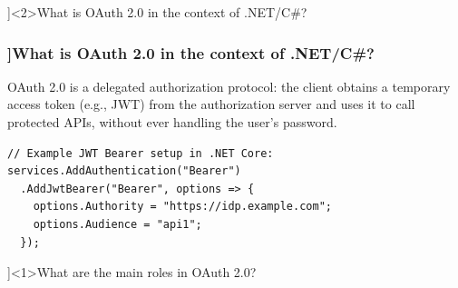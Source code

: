 \QuestionSlide[\CategoryBadge[AuthColor!20]{Security}]<2>{What is OAuth 2.0 in the context of .NET/C\#?}

\begin{frame}[fragile]
  \frametitle{\AnswerTitle[\CategoryBadge[OOPColor!20]{C\#} ]{What is OAuth 2.0 in the context of .NET/C\#?}}

  {\footnotesize
  OAuth 2.0 is a delegated authorization protocol: the client obtains a temporary access token (e.g., JWT) from the authorization server and uses it to call protected APIs, without ever handling the user’s password.
  }

  \begin{verbatim}
// Example JWT Bearer setup in .NET Core:
services.AddAuthentication("Bearer")
  .AddJwtBearer("Bearer", options => {
    options.Authority = "https://idp.example.com";
    options.Audience = "api1";
  });
  \end{verbatim}
\end{frame}

\QuestionSlide[\CategoryBadge[AuthColor!20]{Security}]<1>{What are the main roles in OAuth 2.0?}

